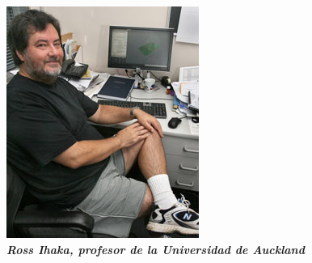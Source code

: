 \documentclass[preview,border={-40pt 0pt -40pt 0pt}]{standalone}
\begin{document}
	\begin{figure}[H]
		\centering
		\includegraphics[height=0.5\textheight]{ihaka.jpg}
		\caption*{\bfseries\itshape Ross Ihaka, profesor de la Universidad de Auckland}
	\end{figure}
\end{document}
